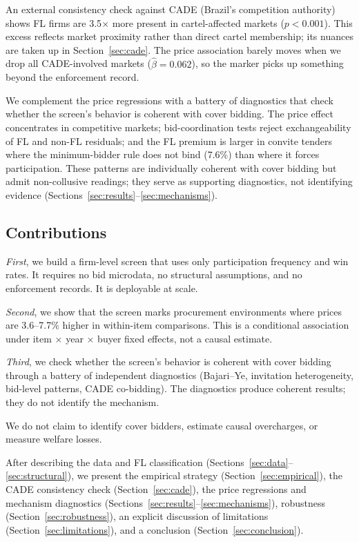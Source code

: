 An external consistency check against CADE (Brazil's competition
authority) shows FL firms are 3.5$\times$ more present in
cartel-affected markets ($p < 0.001$). This excess reflects market
proximity rather than direct cartel membership; its nuances are taken
up in Section~\ref{sec:cade}. The price association barely moves when
we drop all CADE-involved markets ($\hat{\beta} = 0.062$), so the
marker picks up something beyond the enforcement record.

We complement the price regressions with a battery of diagnostics
that check whether the screen's behavior is coherent with cover
bidding. The price effect concentrates in competitive markets;
bid-coordination tests reject exchangeability of FL and non-FL
residuals; and the FL premium is larger in convite tenders where the
minimum-bidder rule does not bind (7.6\%) than where it forces
participation. These patterns are individually coherent with cover
bidding but admit non-collusive readings; they serve as supporting
diagnostics, not identifying evidence
(Sections~\ref{sec:results}--\ref{sec:mechanisms}).

\subsection{Contributions}

\emph{First}, we build a firm-level screen that uses only participation
frequency and win rates. It requires no bid microdata, no structural
assumptions, and no enforcement records. It is deployable at scale.

\emph{Second}, we show that the screen marks procurement environments
where prices are 3.6--7.7\% higher in within-item comparisons. This is
a conditional association under item $\times$ year $\times$ buyer fixed
effects, not a causal estimate.

\emph{Third}, we check whether the screen's behavior is coherent with
cover bidding through a battery of independent diagnostics (Bajari--Ye,
invitation heterogeneity, bid-level patterns, CADE co-bidding). The
diagnostics produce coherent results; they do not identify the
mechanism.

We do not claim to identify cover bidders, estimate causal overcharges,
or measure welfare losses.

After describing the data and FL classification
(Sections~\ref{sec:data}--\ref{sec:structural}), we present the
empirical strategy (Section~\ref{sec:empirical}), the CADE
consistency check (Section~\ref{sec:cade}), the price regressions
and mechanism diagnostics
(Sections~\ref{sec:results}--\ref{sec:mechanisms}), robustness
(Section~\ref{sec:robustness}), an explicit discussion of
limitations (Section~\ref{sec:limitations}), and a conclusion
(Section~\ref{sec:conclusion}).
